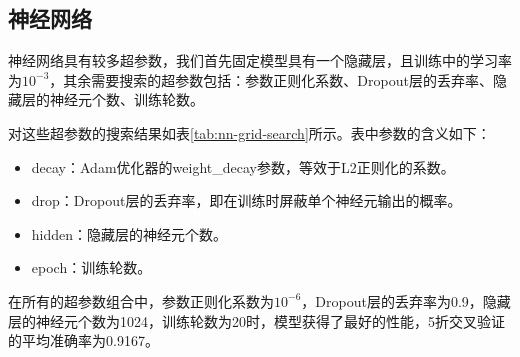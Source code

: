 \documentclass{article}
\begin{document}
\subsection{神经网络}

神经网络具有较多超参数，我们首先固定模型具有一个隐藏层，且训练中的学习率为$10^{-3}$，其余需要搜索的超参数包括：参数正则化系数、Dropout层的丢弃率、隐藏层的神经元个数、训练轮数。

对这些超参数的搜索结果如表\ref{tab:nn-grid-search}所示。表中参数的含义如下：
\begin{itemize}
    \setlength{\itemsep}{0pt}
    \setlength{\parsep}{0pt}
    \setlength{\parskip}{0pt}
    \item decay：Adam优化器的weight\_decay参数，等效于L2正则化的系数。
    \item drop：Dropout层的丢弃率，即在训练时屏蔽单个神经元输出的概率。
    \item hidden：隐藏层的神经元个数。
    \item epoch：训练轮数。
\end{itemize}

在所有的超参数组合中，参数正则化系数为$10^{-6}$，Dropout层的丢弃率为0.9，隐藏层的神经元个数为1024，训练轮数为20时，模型获得了最好的性能，5折交叉验证的平均准确率为0.9167。
\end{document}
